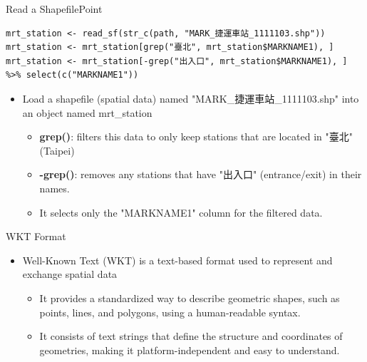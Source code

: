 \documentclass[dvipsnames,hyperref={pdfpagelabels=false}]{beamer}
\begin{document}
\begin{frame}[fragile]{Read a Shapefile}{Point}
	
\begin{lstlisting}
mrt_station <- read_sf(str_c(path, "MARK_捷運車站_1111103.shp"))
mrt_station <- mrt_station[grep("臺北", mrt_station$MARKNAME1), ]
mrt_station <- mrt_station[-grep("出入口", mrt_station$MARKNAME1), ] %>% select(c("MARKNAME1"))
\end{lstlisting}
	\begin{itemize}
		
		\item Load a shapefile (spatial data) named "MARK\_捷運車站\_1111103.shp" into an object named mrt\_station
		\vspace{0.2cm}
		\begin{itemize}
			\item \textbf{grep()}: filters this data to only keep stations that are located in "臺北" (Taipei)
					\vspace{0.2cm}
			\item \textbf{-grep()}: removes any stations that have "出入口" (entrance/exit) in their names.		
								\vspace{0.2cm}
			\item It selects only the "MARKNAME1" column for the filtered data.					
		\end{itemize}
		
	\end{itemize}
\end{frame}




\begin{frame}{WKT Format}
\begin{itemize}
	\item Well-Known Text (WKT) is a text-based format used to represent and exchange spatial data
			\vspace{0.2cm}
			\begin{itemize}
	\item It provides a standardized way to describe geometric shapes, such as points, lines, and polygons, using a human-readable syntax.
			\vspace{0.2cm}
	\item It consists of text strings that define the structure and coordinates of geometries, making it platform-independent and easy to understand.
\end{itemize}
\end{itemize}
\end{frame}
\end{document}
